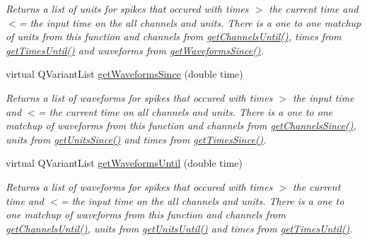 \begin{DoxyCompactItemize}
\begin{DoxyCompactList}\small\item\em Returns a list of units for spikes that occured with times $>$ the current time and $<$= the input time on the all channels and units. There is a one to one matchup of units from this function and channels from \hyperlink{class_picto_1_1_live_spike_reader_a8068875b5d7ff0785ba6e21e2b947681}{get\-Channels\-Until()}, times from \hyperlink{class_picto_1_1_live_spike_reader_af76447878e8fcf2d18b92a7739baed80}{get\-Times\-Until()} and waveforms from \hyperlink{class_picto_1_1_live_spike_reader_a177e75e33b122f46f6836ca2b04d2ea0}{get\-Waveforms\-Since()}. \end{DoxyCompactList}\item 
\hypertarget{class_picto_1_1_live_spike_reader_a177e75e33b122f46f6836ca2b04d2ea0}{virtual Q\-Variant\-List \hyperlink{class_picto_1_1_live_spike_reader_a177e75e33b122f46f6836ca2b04d2ea0}{get\-Waveforms\-Since} (double time)}\label{class_picto_1_1_live_spike_reader_a177e75e33b122f46f6836ca2b04d2ea0}

\begin{DoxyCompactList}\small\item\em Returns a list of waveforms for spikes that occured with times $>$ the input time and $<$= the current time on all channels and units. There is a one to one matchup of waveforms from this function and channels from \hyperlink{class_picto_1_1_live_spike_reader_aa5b2f11f42b9d6a946ca1a8123aa0bc1}{get\-Channels\-Since()}, units from \hyperlink{class_picto_1_1_live_spike_reader_a534fac19991435569beae1d2abda0446}{get\-Units\-Since()} and times from \hyperlink{class_picto_1_1_live_spike_reader_adf4156ef2c32edfee42a7a82a63b0808}{get\-Times\-Since()}. \end{DoxyCompactList}\item 
\hypertarget{class_picto_1_1_live_spike_reader_a77284a20bc8375b58957c3853dd24f5c}{virtual Q\-Variant\-List \hyperlink{class_picto_1_1_live_spike_reader_a77284a20bc8375b58957c3853dd24f5c}{get\-Waveforms\-Until} (double time)}\label{class_picto_1_1_live_spike_reader_a77284a20bc8375b58957c3853dd24f5c}

\begin{DoxyCompactList}\small\item\em Returns a list of waveforms for spikes that occured with times $>$ the current time and $<$= the input time on the all channels and units. There is a one to one matchup of waveforms from this function and channels from \hyperlink{class_picto_1_1_live_spike_reader_a8068875b5d7ff0785ba6e21e2b947681}{get\-Channels\-Until()}, units from \hyperlink{class_picto_1_1_live_spike_reader_ad285c7f58f3d0e910a969ae351da6198}{get\-Units\-Until()} and times from \hyperlink{class_picto_1_1_live_spike_reader_af76447878e8fcf2d18b92a7739baed80}{get\-Times\-Until()}. \end{DoxyCompactList}\end{DoxyCompactItemize}


